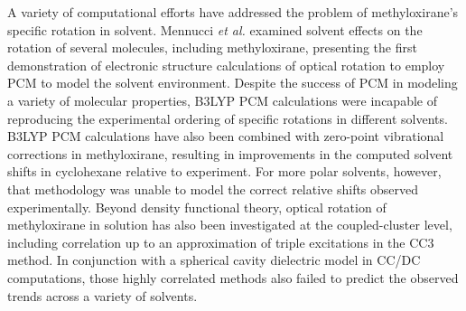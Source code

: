 A variety of computational efforts have addressed the problem of
methyloxirane's specific rotation in solvent. Mennucci \emph{et al.}
\cite{Mennucci:02}
examined solvent effects on the rotation of several molecules,
including methyloxirane, presenting the first demonstration of
electronic structure calculations of optical rotation to employ 
PCM to model the solvent environment. Despite the success of PCM
in modeling a variety of molecular properties,\cite{Tomasi:05}
B3LYP\cite{Becke:93,Lee:88,Stephens:94} PCM calculations were incapable of reproducing the experimental
ordering of specific rotations in different solvents. B3LYP PCM
calculations have also been combined with zero-point vibrational
corrections in methyloxirane,\cite{Kongsted:08} resulting in
improvements in the computed solvent shifts in cyclohexane relative
to experiment. For more polar solvents, however, that methodology was
unable to model the correct relative shifts observed experimentally.
Beyond density functional theory, optical rotation of methyloxirane
in solution has also been investigated at the coupled-cluster level,
including correlation up to an approximation of triple excitations
in the CC3 method.\cite{Kongsted:05} In conjunction with a spherical
cavity dielectric model in CC/DC computations,\cite{Kongsted:05} 
those highly correlated methods also failed to predict the observed trends
across a variety of solvents.

